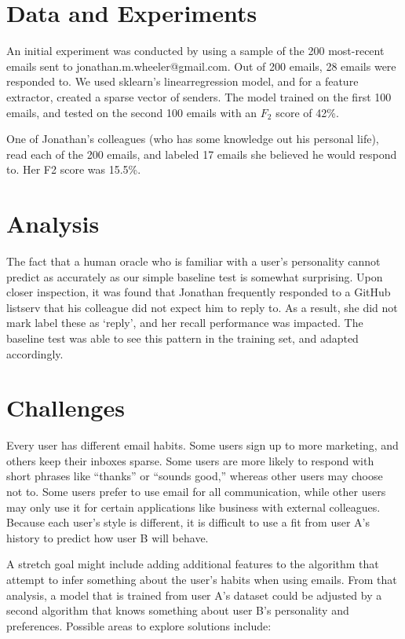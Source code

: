 \documentclass{article}
\begin{document}
\section{Data and Experiments}
An initial experiment was conducted by using a sample of the 200 most-recent emails sent to jonathan.m.wheeler@gmail.com.
Out of 200 emails, 28 emails were responded to.
We used sklearn's linearregression model, and for a feature extractor, created a sparse vector of senders.
The model trained on the first 100 emails, and tested on the second 100 emails with an $F_2$ score of 42\%. 

One of Jonathan's colleagues (who has some knowledge out his personal life), read each of the 200 emails, and labeled 17 emails she believed he would respond to. Her F2 score was 15.5\%.

\section{Analysis}
The fact that a human oracle who is familiar with a user's personality cannot predict as accurately as our simple baseline test is somewhat surprising. Upon closer inspection, it was found that Jonathan frequently responded to a GitHub listserv that his colleague did not expect him to reply to. As a result, she did not mark label these as `reply', and her recall performance was impacted. The baseline test was able to see this pattern in the training set, and adapted accordingly.

\section{Challenges}
Every user has different email habits. Some users sign up to more marketing, and others keep their inboxes sparse. Some users are more likely to respond with short phrases like ``thanks'' or ``sounds good,'' whereas other users may choose not to. Some users prefer to use email for all communication, while other users may only use it for certain applications like business with external colleagues. Because each user's style is different, it is difficult to use a fit from user A's history to predict how user B will behave.

A stretch goal might include adding additional features to the algorithm that attempt to infer something about the user's habits when using emails. From that analysis, a model that is trained from user A's dataset could be adjusted by a second algorithm that knows something about user B's personality and preferences. Possible areas to explore solutions include:
\end{document}
